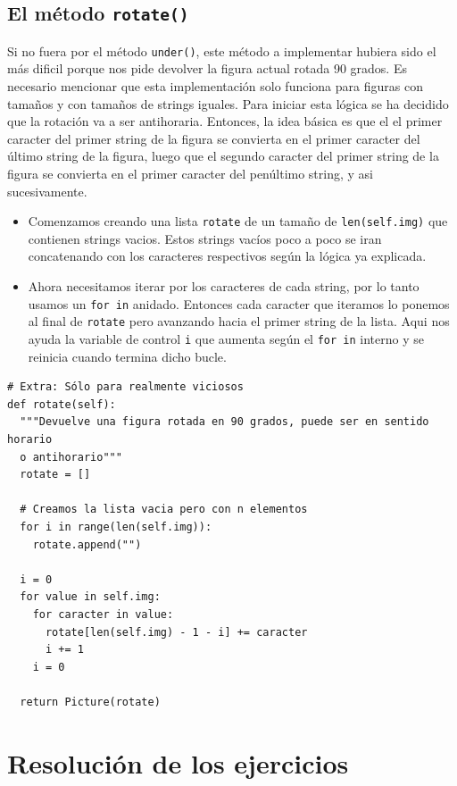\documentclass[10pt, a4paper]{article}
\newcommand{\mintpython}[1]{\texttt{#1}}
\begin{document}
\subsection{El método \mintpython{rotate()}}
Si no fuera por el método \mintpython{under()}, este método a implementar hubiera sido el más dificil porque nos pide devolver la figura actual rotada 90 grados. Es necesario mencionar que esta implementación solo funciona para figuras con tamaños y con tamaños de strings iguales.
\singlespacing
Para iniciar esta lógica se ha decidido que la rotación va a ser antihoraria. Entonces, la idea básica es que el el primer caracter del primer string de la figura se convierta en el primer caracter del último string de la figura, luego que el segundo caracter del primer string de la figura se convierta en el primer caracter del penúltimo string, y asi sucesivamente.

\begin{itemize}
  \item Comenzamos creando una lista \mintpython{rotate} de un tamaño de \mintpython{len(self.img)} que contienen strings vacios. Estos strings vacíos poco a poco se iran concatenando con los caracteres respectivos según la lógica ya explicada.
  \item Ahora necesitamos iterar por los caracteres de cada string, por lo tanto usamos un \mintpython{for in} anidado. Entonces cada caracter que iteramos lo ponemos al final de \mintpython{rotate} pero avanzando hacia el primer string de la lista. Aqui nos ayuda la variable de control \mintpython{i} que aumenta según el \mintpython{for in} interno y se reinicia cuando termina dicho bucle. 
\end{itemize}

\begin{verbatim}
# Extra: Sólo para realmente viciosos
def rotate(self):
  """Devuelve una figura rotada en 90 grados, puede ser en sentido horario
  o antihorario"""
  rotate = []

  # Creamos la lista vacia pero con n elementos
  for i in range(len(self.img)):
    rotate.append("")

  i = 0
  for value in self.img:
    for caracter in value:
      rotate[len(self.img) - 1 - i] += caracter
      i += 1
    i = 0

  return Picture(rotate)
\end{verbatim}

\section{Resolución de los ejercicios}
\end{document}
